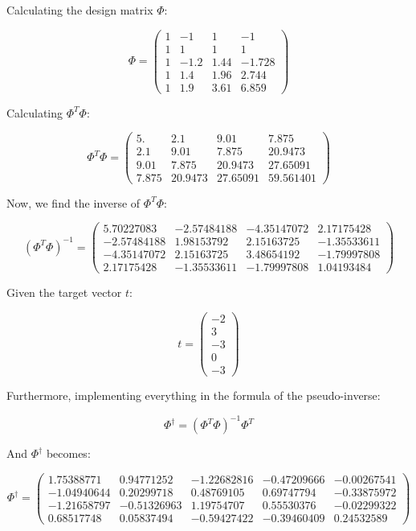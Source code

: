\documentclass{article}
\begin{document}
Calculating the design matrix \( \Phi \):

\[
\Phi = 
\begin{pmatrix}
1 & -1 & 1 & -1 \\
1 & 1 & 1 & 1 \\
1 & -1.2 & 1.44 & -1.728 \\
1 & 1.4 & 1.96 & 2.744 \\
1 & 1.9 & 3.61 & 6.859
\end{pmatrix}
\]

Calculating \( \Phi^T \Phi \):

\[
\Phi^T \Phi = 
\begin{pmatrix} 
5. & 2.1 & 9.01 & 7.875 \\ 
2.1 & 9.01 & 7.875 & 20.9473 \\ 
9.01 & 7.875 & 20.9473 & 27.65091 \\ 
7.875 & 20.9473 & 27.65091 & 59.561401 
\end{pmatrix}
\]

Now, we find the inverse of \( \Phi^T \Phi \):

\[
\left( \Phi^T \Phi \right)^{-1} = 
\begin{pmatrix} 
5.70227083 & -2.57484188 & -4.35147072 & 2.17175428 \\ 
-2.57484188 & 1.98153792 & 2.15163725 & -1.35533611 \\ 
-4.35147072 & 2.15163725 & 3.48654192 & -1.79997808 \\ 
2.17175428 & -1.35533611 & -1.79997808 & 1.04193484 
\end{pmatrix}
\]

Given the target vector \( t \):

\[
t = 
\begin{pmatrix} 
-2 \\ 
3 \\ 
-3 \\ 
0 \\ 
-3 
\end{pmatrix}
\]

Furthermore, implementing everything in the formula of the pseudo-inverse:

\[
\Phi^\dagger = \left( \Phi^T \Phi \right)^{-1} \Phi^T
\]

And \( \Phi^\dagger \) becomes:

\[
\Phi^\dagger = 
\begin{pmatrix} 
1.75388771 & 0.94771252 & -1.22682816 & -0.47209666 & -0.00267541 \\ 
-1.04940644 & 0.20299718 & 0.48769105 & 0.69747794 & -0.33875972 \\ 
-1.21658797 & -0.51326963 & 1.19754707 & 0.55530376 & -0.02299322 \\ 
0.68517748 & 0.05837494 & -0.59427422 & -0.39460409 & 0.24532589 
\end{pmatrix}
\]
\end{document}
